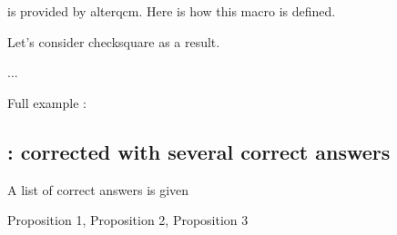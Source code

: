  is provided by alterqcm.
 Here is how this macro is defined.

\begin{tkzexample}
 \newcommand*{\dingchecksquare}{\mbox{\ding{114}%
 \hspace{-.7em}\raisebox{.2ex}[1ex]{\ding{51}}}} \end{tkzexample}

\medskip Let's consider checksquare as a result.

\begin{tkzexample}
 \begin{alterqcm}[lq=90mm,symb=\altersquare,corsymb=\dingchecksquare]
   ...
 \end{alterqcm}
\end{tkzexample}

\medskip
Full example :

\medskip
 \begin{alterqcm}[VF,lq=125mm,correction,
                  symb    = \dingsquare,
                  corsymb = \dingchecksquare]
 \AQquestion[br=1]{For all $x \in ]-3~;~2],~f'(x) \geqslant 0$.}
 \end{alterqcm}


\begin{tkzexample}
 \begin{alterqcm}[VF,lq=125mm,correction,
                  symb    = \dingsquare,
                  corsymb = \dingchecksquare]
 \AQquestion[br=1]{For any $x \in ]-3~;~2],~f'(x) \geqslant 0$.}
 \end{alterqcm}
\end{tkzexample}

\subsection{ : corrected with several correct answers}

A list of correct answers is given
\begin{tkzexample}
\begin{alterqcm}[correction]
{%
{Proposition 1},
{Proposition 2},
{Proposition 3}%
}
\end{alterqcm}
\end{tkzexample}

